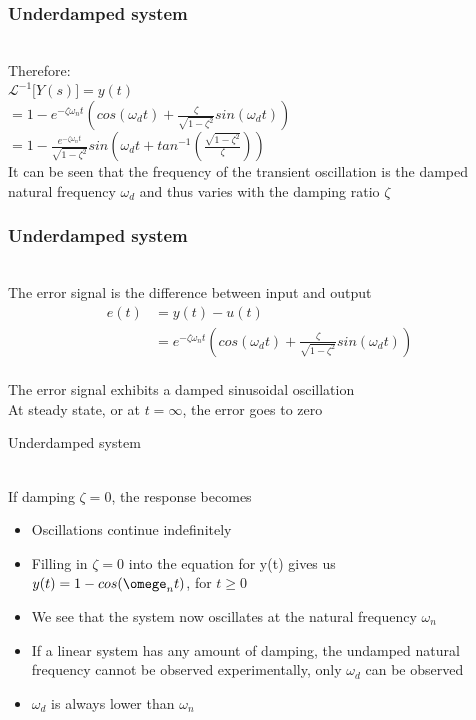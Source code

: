 \begin{frame}
\frametitle{Underdamped system}
\\Therefore:\\ 
\vspace{0.25cm}
$\mathcal{L}^{-1}\Big[Y(s)\Big]=y(t)$
\vspace{0.35cm}
\pause
\\$ = 1 - e^{-\zeta\omega_n t}(cos(\omega_d t)+\frac{\zeta}{\sqrt{1 - \zeta^2}}sin(\omega_d t))$
\vspace{0.25cm}
\\$ = 1 - \frac{e^{-\zeta\omega_n t}}{\sqrt{1-\zeta^2}}sin(\omega_d t+ tan^{-1}(\frac{\sqrt{1-\zeta^2}}{\zeta}))$
\vspace{0.4cm}
\pause
\\ It can be seen that the frequency of the transient oscillation is the damped natural frequency $\omega_d$ and thus varies with the damping ratio $\zeta$
\end{frame}

\begin{frame}
\frametitle{Underdamped system}
\\ The error signal is the difference between input and output
\begin{align*}
e(t)&= y(t) -u(t)
\\&= e^{-\zeta\omega_n t}(cos(\omega_d t)+\frac{\zeta}{\sqrt{1 - \zeta^2}}sin(\omega_d t))
\end{align*}
\pause
\\ The error signal exhibits a damped sinusoidal oscillation
\vspace{0.8cm}
\pause
\\ At steady state, or at $t=\infty$, the error goes to zero
\end{frame}

\begin{frame}{Underdamped system}

\\ If damping $\zeta=0$, the response becomes 
\pause
\begin{itemize}
\vspace{0.25cm}
\item Oscillations continue indefinitely
\vspace{0.25cm}
\pause
\item Filling in $\zeta=0$ into the equation for y(t) gives us
\\ $y(t) = 1 -cos(\omege_n t)$, for $t\ge 0$
\vspace{0.25cm}
\pause
\item We see that the system now oscillates at the natural frequency $\omega_n$
\pause
\vspace{0.25cm}
\item If a linear system has any amount of damping, the undamped natural frequency cannot be observed experimentally, only $\omega_d$ can be observed
\pause
\vspace{0.25cm}
\item $\omega_d$ is always lower than $\omega_n$
\end{itemize} 
\end{frame}

